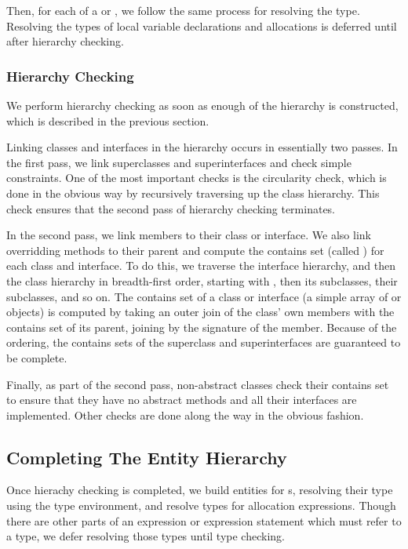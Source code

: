 \documentclass[pdftex,11pt,a4paper]{article}
\begin{document}
Then, for each  of a  or
, we follow the same process for resolving the
type. Resolving the types of local variable declarations and
allocations is deferred until after hierarchy checking.

\subsubsection{Hierarchy Checking}

We perform hierarchy checking as soon as enough of the hierarchy is
constructed, which is described in the previous section.

Linking classes and interfaces in the hierarchy occurs in essentially
two passes. In the first pass, we link superclasses and
superinterfaces and check simple constraints. One of the most
important checks is the circularity check, which is done in the
obvious way by recursively traversing up the class hierarchy. This
check ensures that the second pass of hierarchy checking terminates.

In the second pass, we link members to their class or interface. We
also link overridding methods to their parent and compute the contains
set (called ) for each class and interface. To do
this, we traverse the interface hierarchy, and then the class
hierarchy in breadth-first order, starting with
, then its subclasses, their subclasses, and
so on. The contains set of a class or interface (a simple array of
 or  objects) is computed by taking an outer
join of the class' own members with the contains set of its parent,
joining by the signature of the member. Because of the ordering,
the contains sets of the superclass and superinterfaces are guaranteed
to be complete.

Finally, as part of the second pass, non-abstract classes check their
contains set to ensure that they have no abstract methods and all
their interfaces are implemented. Other checks are done along the way
in the obvious fashion.

\subsection{Completing The Entity Hierarchy}

Once hierachy checking is completed, we build entities for
s, resolving their type using the type
environment, and resolve types for allocation expressions. Though
there are other parts of an expression or expression statement which
must refer to a type, we defer resolving those types until type
checking.
\end{document}

